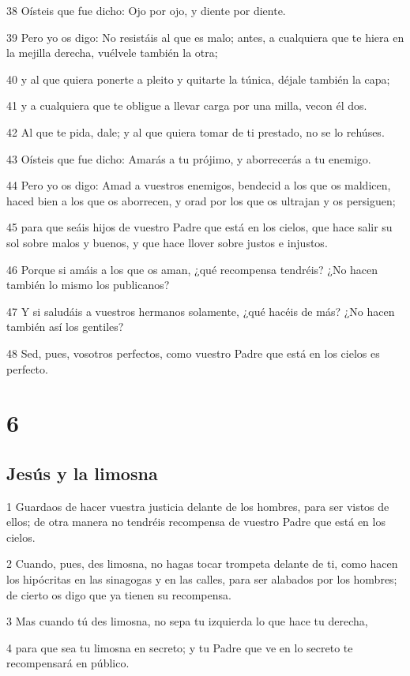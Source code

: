 \par 38 Oísteis que fue dicho: Ojo por ojo, y diente por diente.
\par 39 Pero yo os digo: No resistáis al que es malo; antes, a cualquiera que te hiera en la mejilla derecha, vuélvele también la otra;
\par 40 y al que quiera ponerte a pleito y quitarte la túnica, déjale también la capa;
\par 41 y a cualquiera que te obligue a llevar carga por una milla, vecon él dos.
\par 42 Al que te pida, dale; y al que quiera tomar de ti prestado, no se lo rehúses.
\par 43 Oísteis que fue dicho: Amarás a tu prójimo, y aborrecerás a tu enemigo.
\par 44 Pero yo os digo: Amad a vuestros enemigos, bendecid a los que os maldicen, haced bien a los que os aborrecen, y orad por los que os ultrajan y os persiguen;
\par 45 para que seáis hijos de vuestro Padre que está en los cielos, que hace salir su sol sobre malos y buenos, y que hace llover sobre justos e injustos.
\par 46 Porque si amáis a los que os aman, ¿qué recompensa tendréis? ¿No hacen también lo mismo los publicanos?
\par 47 Y si saludáis a vuestros hermanos solamente, ¿qué hacéis de más? ¿No hacen también así los gentiles?
\par 48 Sed, pues, vosotros perfectos, como vuestro Padre que está en los cielos es perfecto.

\chapter{6}

\section*{Jesús y la limosna}

\par 1 Guardaos de hacer vuestra justicia delante de los hombres, para ser vistos de ellos; de otra manera no tendréis recompensa de vuestro Padre que está en los cielos.
\par 2 Cuando, pues, des limosna, no hagas tocar trompeta delante de ti, como hacen los hipócritas en las sinagogas y en las calles, para ser alabados por los hombres; de cierto os digo que ya tienen su recompensa.
\par 3 Mas cuando tú des limosna, no sepa tu izquierda lo que hace tu derecha,
\par 4 para que sea tu limosna en secreto; y tu Padre que ve en lo secreto te recompensará en público.

